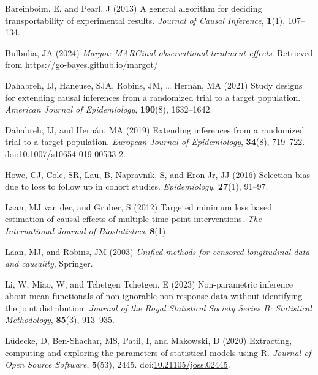 \documentclass[
  singlecolumn]{article}
\newlength{\cslhangindent}
\newenvironment{CSLReferences}[2] %
 {\begin{list}{}{%
  \setlength{\itemindent}{0pt}
  \setlength{\leftmargin}{0pt}
  \setlength{\parsep}{0pt}
  \ifodd #1
   \setlength{\leftmargin}{\cslhangindent}
   \setlength{\itemindent}{-1\cslhangindent}
  \fi
  \setlength{\itemsep}{#2\baselineskip}}}
 {\end{list}}
\begin{document}
\label{refs}
\begin{CSLReferences}{1}{0}
Bareinboim, E, and Pearl, J (2013) A general algorithm for deciding
transportability of experimental results. \emph{Journal of Causal
Inference}, \textbf{1}(1), 107--134.

Bulbulia, JA (2024) \emph{Margot: MARGinal observational
treatment-effects}. Retrieved from
\url{https://go-bayes.github.io/margot/}

Dahabreh, IJ, Haneuse, SJA, Robins, JM, \ldots{} Hernán, MA (2021) Study
designs for extending causal inferences from a randomized trial to a
target population. \emph{American Journal of Epidemiology},
\textbf{190}(8), 1632--1642.

Dahabreh, IJ, and Hernán, MA (2019) Extending inferences from a
randomized trial to a target population. \emph{European Journal of
Epidemiology}, \textbf{34}(8), 719--722.
doi:\href{https://doi.org/10.1007/s10654-019-00533-2}{10.1007/s10654-019-00533-2}.

Howe, CJ, Cole, SR, Lau, B, Napravnik, S, and Eron Jr, JJ (2016)
Selection bias due to loss to follow up in cohort studies.
\emph{Epidemiology}, \textbf{27}(1), 91--97.

Laan, MJ van der, and Gruber, S (2012) Targeted minimum loss based
estimation of causal effects of multiple time point interventions.
\emph{The International Journal of Biostatistics}, \textbf{8}(1).

Laan, MJ, and Robins, JM (2003) \emph{Unified methods for censored
longitudinal data and causality}, Springer.

Li, W, Miao, W, and Tchetgen Tchetgen, E (2023) Non-parametric inference
about mean functionals of non-ignorable non-response data without
identifying the joint distribution. \emph{Journal of the Royal
Statistical Society Series B: Statistical Methodology}, \textbf{85}(3),
913--935.

Lüdecke, D, Ben-Shachar, MS, Patil, I, and Makowski, D (2020)
Extracting, computing and exploring the parameters of statistical models
using {R}. \emph{Journal of Open Source Software}, \textbf{5}(53), 2445.
doi:\href{https://doi.org/10.21105/joss.02445}{10.21105/joss.02445}.


\end{CSLReferences}
\end{document}
